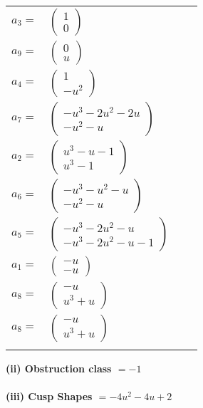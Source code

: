 \documentclass[1p]{elsarticle_modified}
\theoremstyle{definition}
\begin{document}
\begin{tabular}{m{7pt} m{180pt} m{7pt} m{180pt} }
\flushright $a_{3}=$&$\begin{pmatrix}1\\0\end{pmatrix}$ \\
\flushright $a_{9}=$&$\begin{pmatrix}0\\u\end{pmatrix}$ \\
\flushright $a_{4}=$&$\begin{pmatrix}1\\- u^2\end{pmatrix}$ \\
\flushright $a_{7}=$&$\begin{pmatrix}- u^3-2 u^2-2 u\\- u^2- u\end{pmatrix}$ \\
\flushright $a_{2}=$&$\begin{pmatrix}u^3- u-1\\u^3-1\end{pmatrix}$ \\
\flushright $a_{6}=$&$\begin{pmatrix}- u^3- u^2- u\\- u^2- u\end{pmatrix}$ \\
\flushright $a_{5}=$&$\begin{pmatrix}- u^3-2 u^2- u\\- u^3-2 u^2- u-1\end{pmatrix}$ \\
\flushright $a_{1}=$&$\begin{pmatrix}- u\\- u\end{pmatrix}$ \\
\flushright $a_{8}=$&$\begin{pmatrix}- u\\u^3+u\end{pmatrix}$\\ \flushright $a_{8}=$&$\begin{pmatrix}- u\\u^3+u\end{pmatrix}$\\&\end{tabular}
\flushleft \textbf{(ii) Obstruction class $= -1$}\\~\\
\flushleft \textbf{(iii) Cusp Shapes $= -4 u^2-4 u+2$}\\~\\
\end{document}
